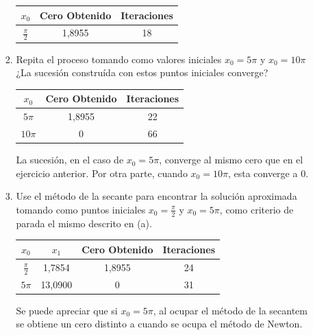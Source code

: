 \documentclass{udparticle}
\begin{document}
\begin{enumerate}
\begin{enumerate}
\begin{enumerate}
        		\begin{table} [H]
        			\centering
        			\begin{tabular}{|c|c|c|}
        				\hline
        				$x_{0}$ & Cero Obtenido & Iteraciones\\
        				\hline
        				$\frac{\pi}{2} $ & 1,8955 & 18\\
        				\hline 
        			\end{tabular}
        		\end{table}
        	
        	\item Repita el proceso tomando como valores iniciales $x_{0}=5\pi$ y $x_{0}=10\pi$ ¿La sucesión construída con estos puntos iniciales converge?
        	 	\begin{table} [H]
        			\centering
        			\begin{tabular}{|c|c|c|}
        				\hline
        				$x_{0}$ & Cero Obtenido & Iteraciones\\
        				\hline
        				$5\pi$ & 1,8955 & 22 \\
        				\hline 
        				$10\pi$ & 0 & 66\\
        				\hline
        			\end{tabular}
        		\end{table}
        		
        La sucesión, en el caso de $x_{0}=5\pi$, converge al mismo cero que en el ejercicio anterior. Por otra parte, cuando $x_{0}=10\pi$, esta converge a 0.
        
        	\item Use el método de la secante para encontrar la solución aproximada tomando como puntos iniciales $x_{0}=\frac{\pi}{2}$ y $x_{0}=5\pi$, como criterio de parada el mismo descrito en (a).
        	\begin{table} [H]
        			\centering
        			\begin{tabular}{|c|c|c|c|}
        				\hline
        				$x_{0}$& $x_{1}$ & Cero Obtenido & Iteraciones\\
        				\hline
        				$\frac{\pi}{2}$ & 1,7854 & 1,8955 & 24 \\
        				\hline 
        				$5\pi$& 13,0900 & 0 & 31\\
        				\hline
        			\end{tabular}
        		\end{table}
        		
        Se puede apreciar que si $x_{0}=5\pi$, al ocupar el método de la secantem se obtiene un cero distinto a cuando se ocupa el método de Newton.	
        

\end{enumerate}
\end{enumerate}
\end{enumerate}
\end{document}
